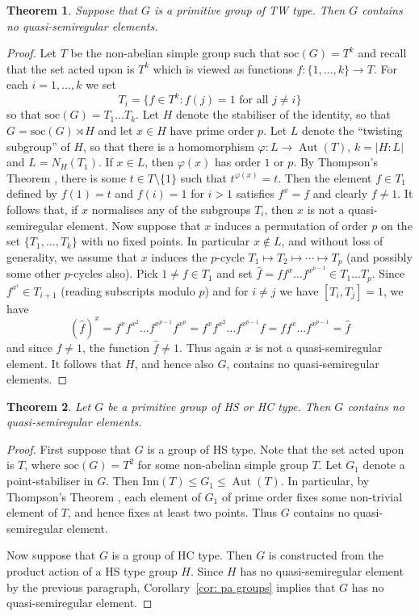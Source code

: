 \documentclass{article}
\newtheorem{thm}{Theorem}[section]
\theoremstyle{remark}
\theoremstyle{definition}
\DeclareMathOperator{\Aut}{Aut}
\newcommand{\Inn}{\mathrm{Inn}}
\newcommand{\soc}{\mathrm{soc}}
\newcommand{\qsre}{quasi-semiregular element}
\newcommand{\qsres}{quasi-semiregular elements}
\begin{document}
\begin{thm}
\label{thm: tw type}
Suppose that $G$ is a primitive group of TW type. Then $G$ contains no {{\qsres}}.
\end{thm}
\begin{proof}
Let $T$ be the non-abelian simple group such that $\soc(G)=T^k$ and recall that the set acted upon is $T^k$ which is viewed as functions $f : \{1,\ldots,k\} \rightarrow T$. For each $i=1,\ldots, k$ we set 
$$T_i = \{ f \in T^k : f(j) = 1\text{ for all }j\neq i \}$$
so that $\soc(G)=T_1 \ldots T_k$. Let $H$ denote the stabiliser of the identity, so that $G=\soc(G) \rtimes H$ and let $x\in H$ have prime order $p$. Let $L$ denote the ``twisting subgroup'' of $H$, so that there is a homomorphism $\varphi : L \rightarrow \Aut(T)$, $k=|H:L|$ and $L=N_H(T_1)$.  If $x\in L$, then $\varphi(x)$ has order $1$ or $p$. By Thompson's Theorem  \cite[Theorem 1]{Thompson}, there is some $t\in T \setminus\{1\}$ such that $t^{\varphi(x)} = t$. Then the element $f\in T_1$ defined by $f(1) = t$ and $f(i)=1$ for $i>1$ satisfies $f^x = f$ and clearly $f\neq 1$. It follows that, if $x$ normalises any of the subgroups $T_i$, then $x$ is not a {\qsre}. Now suppose that $x$ induces a permutation of order $p$ on the set $\{T_1,\ldots,T_k\}$ with no fixed points. In particular $x\not\in L$, and without loss of generality, we assume that $x$ induces the $p$-cycle $T_1 \mapsto T_2 \mapsto  \cdots \mapsto T_p$ (and possibly some other $p$-cycles also). Pick $1 \neq f \in T_1$ 
and set $\hat{f} = f f^x \ldots f^{x^{p-1}} \in T_1\ldots T_p$. Since $f^{x^i} \in T_{i+1}$  (reading subscripts modulo $p$) and for $i\neq j$ we have $[T_i,T_j]=1$, we have  
$$
(\hat{f})^x = f^xf^{x^2} \ldots f^{x^{p-1}}f^{x^p}= f^x f^{x^2} \ldots f^{x^{p-1}} f = f f^x \ldots f^{x^{p-1}} = \hat{f}
$$
and since $f\neq 1$, the function $\hat{f}\neq 1$. Thus again $x$ is not a {\qsre}. It follows that $H$, and hence also $G$, contains no {\qsres}.
\end{proof}




\begin{thm}
\label{thm: hs groups}
Let $G$ be a primitive group of HS or HC type. Then $G$ contains no {{\qsres}}.
\end{thm}
\begin{proof}
First suppose that $G$ is a group of HS type. Note that the set acted upon is $T$, where $\soc(G)=T^2$ for some non-abelian simple group $T$. Let $G_1$ denote a point-stabiliser in $G$. Then $\Inn(T) \leqslant G_1 \leqslant \Aut(T)$. In particular, by Thompson's Theorem \cite[Theorem 1]{Thompson}, each element of $G_1$ of prime order fixes some non-trivial element of $T$, and hence fixes at least two points. Thus $G$ contains no {{\qsre}}.


Now suppose that $G$ is a group of HC type. Then $G$ is constructed from the product action of a HS type group $H$. Since $H$ has no {\qsre} by the previous paragraph, Corollary~\ref{cor: pa groups} implies that $G$ has no {\qsre}.
\end{proof}
\end{document}
